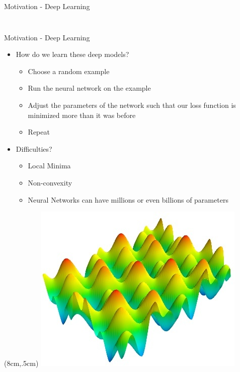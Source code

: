 \documentclass{beamer}
\begin{document}
\begin{frame}{Motivation - Deep Learning}
\begin{columns}[T]
\begin{column}{.48\textwidth}
\begin{figure}
\end{figure}

\end{column}%
\end{columns}



\end{frame}

\begin{frame}{Motivation - Deep Learning}
\begin{itemize}
\item How do we learn these deep models?
\begin{itemize}
\item Choose a random example
\item Run the neural network on the example
\item Adjust the parameters of the network such that our loss function is minimized more than it was before
\item Repeat
\end{itemize}
\pause
\item Difficulties?
\begin{itemize}
\item Local Minima
\item Non-convexity
\item Neural Networks can have millions or even billions of parameters
\end{itemize}
\end{itemize}
\begin{textblock*}{5cm}(8cm,.5cm) %
\includegraphics[scale = .3]{./img/2d_func}
\end{textblock*}
\end{frame}
\end{document}
